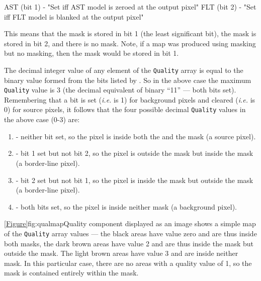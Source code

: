 \begin{terminalv}
   AST (bit 1) - "Set iff AST model is zeroed at the output pixel"
   FLT (bit 2) - "Set iff FLT model is blanked at the output pixel"
\end{terminalv}

This means that the  mask is stored in bit 1 (the least significant
bit), the  mask is stored in bit 2, and there is no 
mask. Note, if
a map was produced using  masking but no  masking,
then the  mask would be stored in bit 1.

The decimal integer value of any element of the \texttt{Quality} array is
equal to the binary value formed from the bits listed by .
So in the above case the maximum \texttt{Quality} value is 3 (the decimal
equivalent of binary ``11'' --- both bits set). Remembering that a bit is set
(\emph{i.e.} is 1) for background pixels and cleared (\emph{i.e.} is 0) for
source pixels, it follows that the four possible decimal \texttt{Quality}
values in the above case (0-3) are:

\begin{enumerate}
\item - neither bit set, so the pixel is inside both the  and the  mask
(a source pixel).

\item - bit 1 set but not bit 2, so the pixel is outside the  mask but
inside the  mask (a border-line pixel).

\item - bit 2 set but not bit 1, so the pixel is inside the  mask but
outside the  mask (a border-line pixel).

\item - both bits set, so the pixel is inside neither mask (a background
pixel).
\end{enumerate}

\cref{Figure}{fig:qualmap}{Quality component displayed as an image} shows
a simple map of the \texttt{Quality} array values --- the black areas have
value zero and are thus inside both masks, the dark brown areas have value 2
and are thus inside the  mask but outside the  mask.
The light brown areas have value 3 and are inside neither mask. In this
particular case, there are no  areas with a quality value of 1, so the
 mask is contained entirely within the  mask.

